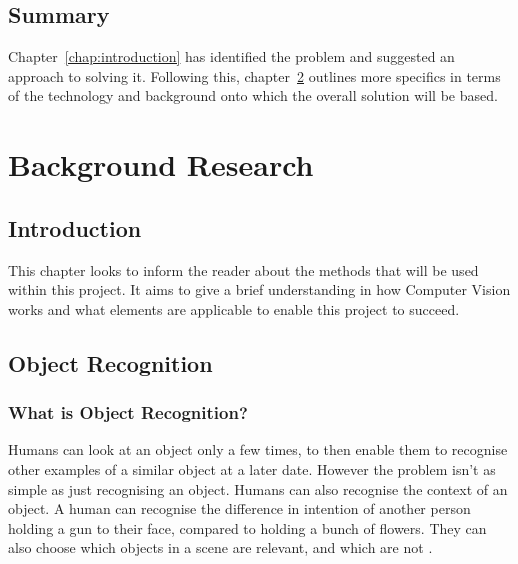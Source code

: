 \documentclass[11pt,oneside]{report}
\begin{document}
		\section{Summary}
		Chapter~\ref{chap:introduction} has identified the problem and suggested an approach to solving it.
		Following this, chapter~\ref{chap:background} outlines more specifics in terms of the technology and background onto which the overall solution will be based.
		
	\chapter{Background Research}\label{chap:background}
			\section{Introduction}
			This chapter looks to inform the reader about the methods that will be used within this project.
			It aims to give a brief understanding in how Computer Vision works and what elements are applicable to enable this project to succeed.
			\section{Object Recognition}
				\subsection{What is Object Recognition?}
				Humans can look at an object only a few times, to then enable them to recognise other examples of a similar object at a later date.
				However the problem isn't as simple as just recognising an object.
				Humans can also recognise the context of an object.
				A human can recognise the difference in intention of another person holding a gun to their face, compared to holding a bunch of flowers.
				They can also choose which objects in a scene are relevant, and which are not \cite{book:modern}.
				
\end{document}
